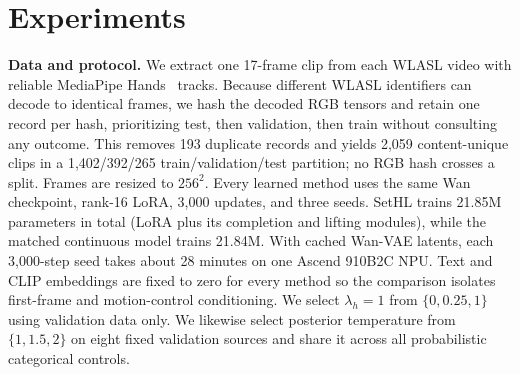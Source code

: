 \documentclass{article}
\begin{document}
\section{Experiments}
\label{sec:experiments}
\textbf{Data and protocol.}
We extract one 17-frame clip from each WLASL video with reliable MediaPipe
Hands~\cite{mediapipe} tracks. Because different WLASL identifiers can decode
to identical frames, we hash the decoded RGB tensors and retain one record per
hash, prioritizing test, then validation, then train without consulting any
outcome. This removes 193 duplicate records and yields 2,059 content-unique
clips in a 1,402/392/265 train/validation/test partition; no RGB hash crosses a
split. Frames are resized to $256^2$. Every learned method uses
the same Wan checkpoint, rank-16 LoRA, 3,000 updates, and three seeds.
SetHL trains 21.85M parameters in total (LoRA plus its completion and lifting
modules), while the matched continuous model trains 21.84M.
With cached Wan-VAE latents, each 3,000-step seed takes about 28 minutes on one
Ascend 910B2C NPU.
Text and CLIP embeddings are fixed to zero for every method so the comparison
isolates first-frame and motion-control conditioning.
We select $\lambda_h=1$ from $\{0,0.25,1\}$ using validation data only.
We likewise select posterior temperature \PosteriorTemperature{} from
$\{1,1.5,2\}$ on eight fixed validation sources and share it across all
probabilistic categorical controls.
\end{document}
